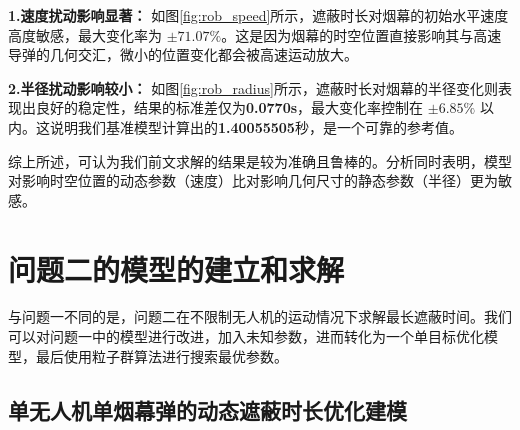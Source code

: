 \documentclass[withoutpreface,bwprint]{cumcmthesis}
\numberwithin{equation}{section} %
\numberwithin{figure}{section} %
\numberwithin{table}{section}  %
\begin{document}
\textbf{1.速度扰动影响显著：} 如图\ref{fig:rob_speed}所示，遮蔽时长对烟幕的初始水平速度高度敏感，最大变化率为 \(\mathbf{\pm71.07\%}\)。这是因为烟幕的时空位置直接影响其与高速导弹的几何交汇，微小的位置变化都会被高速运动放大。

\textbf{2.半径扰动影响较小：} 如图\ref{fig:rob_radius}所示，遮蔽时长对烟幕的半径变化则表现出良好的稳定性，结果的标准差仅为\textbf{0.0770s}，最大变化率控制在 \(\mathbf{\pm6.85\%}\) 以内。这说明我们基准模型计算出的\textbf{1.40055505}秒，是一个可靠的参考值。

综上所述，可认为我们前文求解的结果是较为准确且鲁棒的。分析同时表明，模型对影响时空位置的动态参数（速度）比对影响几何尺寸的静态参数（半径）更为敏感。


\section{问题二的模型的建立和求解}

与问题一不同的是，问题二在不限制无人机的运动情况下求解最长遮蔽时间。我们可以对问题一中的模型进行改进，加入未知参数，进而转化为一个单目标优化模型，最后使用粒子群算法进行搜索最优参数。

\subsection{单无人机单烟幕弹的动态遮蔽时长优化建模}

\end{document}
